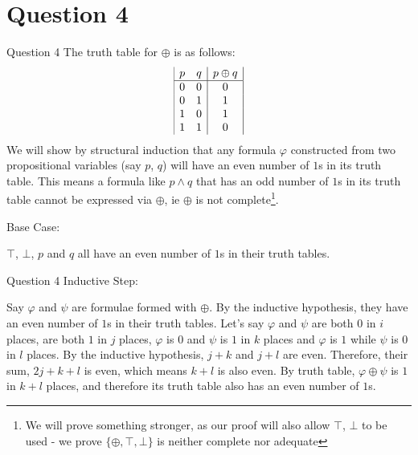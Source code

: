 \documentclass{beamer}
\begin{document}
    \section{Question 4}
    {
        \begin{frame}{Question 4}
            The truth table for $\oplus$ is as follows:
            \begin{displaymath}
                \begin{array}{|c c|c|}
                    p & q & p \oplus q\\ %
                    \hline %
                    0 & 0 & 0\\
                    0 & 1 & 1\\
                    1 & 0 & 1\\
                    1 & 1 & 0\\
                \end{array}
            \end{displaymath}
            We will show by structural induction that any formula $\varphi$ constructed from two propositional variables (say $p$, $q$) will have an even number of $1$s in its truth table. This means a formula like $p \land q$ that has an odd number of $1$s in its truth table cannot be expressed via $\oplus$, ie $\oplus$ is not complete\footnote{We will prove something stronger, as our proof will also allow $\top$, $\bot$ to be used - we prove $\{\oplus,\top, \bot\}$ is neither complete nor adequate}.

            Base Case:

            $\top$, $\bot$, $p$ and $q$ all have an even number of $1$s in their truth tables.
        \end{frame}
        \begin{frame}{Question 4}
            Inductive Step:

            Say $\varphi$ and $\psi$ are formulae formed with $\oplus$. By the inductive hypothesis, they have an even number of $1$s in their truth tables. Let's say $\varphi$ and $\psi$ are both $0$ in $i$ places, are both $1$ in $j$ places, $\varphi$ is $0$ and $\psi$ is $1$ in $k$ places and $\varphi$ is $1$ while $\psi$ is $0$ in $l$ places. By the inductive hypothesis, $j + k$ and $j + l$ are even. Therefore, their sum, $2j + k + l$ is even, which means $k + l$ is also even. By truth table, $\varphi \oplus \psi$ is $1$ in $k + l$ places, and therefore its truth table also has an even number of $1$s.


\end{frame}}
\end{document}
